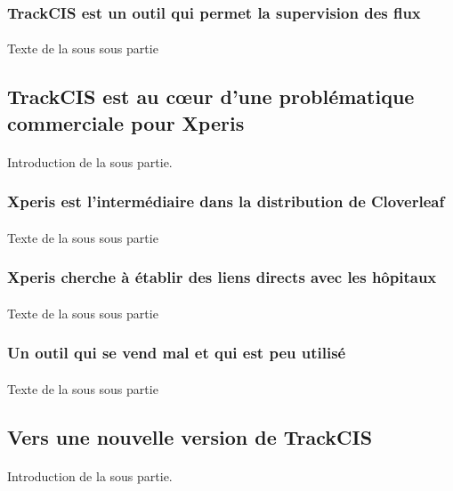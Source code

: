 		\subsubsection{TrackCIS est un outil qui permet la supervision des flux}
			\paragraph{}
			Texte de la sous sous partie
	
	\subsection{TrackCIS est au cœur d'une problématique commerciale pour Xperis}
		\paragraph{}
		Introduction de la sous partie.
		
		\subsubsection{Xperis est l'intermédiaire dans la distribution de Cloverleaf}
			\paragraph{}
			Texte de la sous sous partie
		\subsubsection{Xperis cherche à établir des liens directs avec les hôpitaux}
			\paragraph{}
			Texte de la sous sous partie
		\subsubsection{Un outil qui se vend mal et qui est peu utilisé}
			\paragraph{}
			Texte de la sous sous partie
	
	\subsection{Vers une nouvelle version de TrackCIS}
		\paragraph{}
		Introduction de la sous partie.
		
